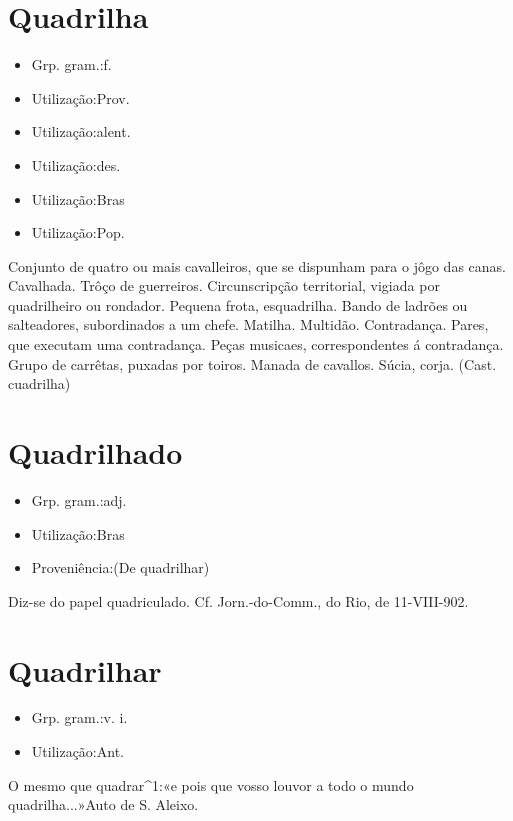 \section{Quadrilha}
\begin{itemize}
\item {Grp. gram.:f.}
\end{itemize}
\begin{itemize}
\item {Utilização:Prov.}
\end{itemize}
\begin{itemize}
\item {Utilização:alent.}
\end{itemize}
\begin{itemize}
\item {Utilização:des.}
\end{itemize}
\begin{itemize}
\item {Utilização:Bras}
\end{itemize}
\begin{itemize}
\item {Utilização:Pop.}
\end{itemize}
Conjunto de quatro ou mais cavalleiros, que se dispunham para o jôgo das canas.
Cavalhada.
Trôço de guerreiros.
Circunscripção territorial, vigiada por quadrilheiro ou rondador.
Pequena frota, esquadrilha.
Bando de ladrões ou salteadores, subordinados a um chefe.
Matilha.
Multidão.
Contradança.
Pares, que executam uma contradança.
Peças musicaes, correspondentes á contradança.
Grupo de carrêtas, puxadas por toiros.
Manada de cavallos.
Súcia, corja.
(Cast. \textunderscore cuadrilha\textunderscore )
\section{Quadrilhado}
\begin{itemize}
\item {Grp. gram.:adj.}
\end{itemize}
\begin{itemize}
\item {Utilização:Bras}
\end{itemize}
\begin{itemize}
\item {Proveniência:(De \textunderscore quadrilhar\textunderscore )}
\end{itemize}
Diz-se do papel quadriculado. Cf. \textunderscore Jorn.-do-Comm.\textunderscore , do Rio, de 11-VIII-902.
\section{Quadrilhar}
\begin{itemize}
\item {Grp. gram.:v. i.}
\end{itemize}
\begin{itemize}
\item {Utilização:Ant.}
\end{itemize}
O mesmo que \textunderscore quadrar\textunderscore ^1:«\textunderscore e pois que vosso louvor a todo o mundo quadrilha...\textunderscore »\textunderscore Auto de S. Aleixo\textunderscore .
